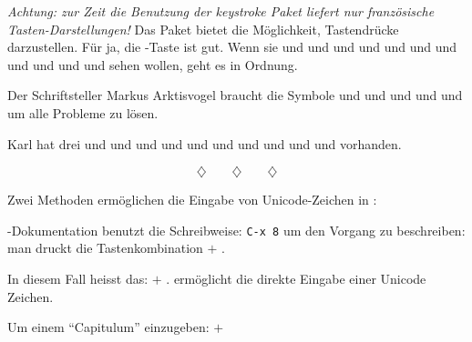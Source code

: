
\emph{Achtung: zur Zeit die Benutzung der keystroke Paket
liefert nur französische Tasten-Darstellungen!} Das
Paket  bietet die Möglichkeit,
Tastendrücke darzustellen. Für ja,
die \hbox{-Taste} ist gut.
Wenn sie \Del{} und %
\Ins{}%
und %
\Esc{}%
und %
\Shift{}%
und %
\Ctrl{}%
und %
\Home{}%
und %
\End{}%
und %
\PgUp{}%
und %
\PgDown{}%
und %
\PrtScroll{}%
und %
\Spacebar{}%
und %
\Break{} sehen wollen, geht es in Ordnung.

Der Schriftsteller Markus Arktisvogel
braucht die Symbole %
\Esc{}%
und %
\Shift{}%
und %
\Ctrl{}%
und %
\Alt{}%
und %
\Return{}%
und %
\Spacebar{}%
um alle Probleme zu lösen.

Karl hat drei \Spacebar{}%
und %
\Return{}%
und %
\BSpace{}%
und %
\Tab{}%
und %
\Alt{}%
und %
\AltGr{}%
und %
\NumLock{}%
und %
\UArrow{}%
und %
\DArrow{}%
und %
\LArrow{}%
und %
\RArrow{} vorhanden.

$$\diamondsuit\qquad\diamondsuit\qquad\diamondsuit$$

Zwei Methoden ermöglichen die Eingabe von
Unicode-Zeichen in :

-Dokumentation benutzt die Schreibweise: %
\texttt{C-x 8}
um den Vorgang zu beschreiben: man druckt die Tastenkombination
\Ctrl$+$%
\space%
.

In diesem Fall heisst das: %
\Ctrl$+$%
\space%
%
\Return{}%
%
\Return . ermöglicht die direkte Eingabe einer
Unicode Zeichen.

Um einem \enquote{Capitulum} einzugeben: %
\hbox{\Ctrl$+$}%
%
\Return{}%
%
%
%
%
\space%
\Return{}%

%


